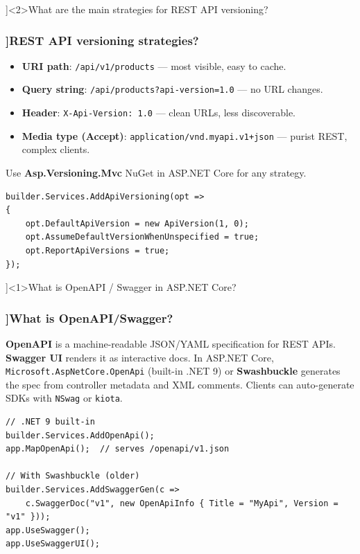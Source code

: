 \QuestionSlide[\CategoryBadge[RestColor!20]{REST \& SignalR}]<2>{What are the main strategies for REST API versioning?}

\begin{frame}[fragile]
  \frametitle{\AnswerTitle[\CategoryBadge[RestColor!20]{REST \& SignalR}]{REST API versioning strategies?}}

  {\footnotesize
  \begin{itemize}
    \item \textbf{URI path}: \texttt{/api/v1/products} — most visible, easy to cache.
    \item \textbf{Query string}: \texttt{/api/products?api-version=1.0} — no URL changes.
    \item \textbf{Header}: \texttt{X-Api-Version: 1.0} — clean URLs, less discoverable.
    \item \textbf{Media type (Accept)}: \texttt{application/vnd.myapi.v1+json} — purist REST, complex clients.
  \end{itemize}
  Use \textbf{Asp.Versioning.Mvc} NuGet in ASP.NET Core for any strategy.
  }

  \begin{verbatim}
builder.Services.AddApiVersioning(opt =>
{
    opt.DefaultApiVersion = new ApiVersion(1, 0);
    opt.AssumeDefaultVersionWhenUnspecified = true;
    opt.ReportApiVersions = true;
});
  \end{verbatim}
\end{frame}

\QuestionSlide[\CategoryBadge[RestColor!20]{REST \& SignalR}]<1>{What is OpenAPI / Swagger in ASP.NET Core?}

\begin{frame}[fragile]
  \frametitle{\AnswerTitle[\CategoryBadge[RestColor!20]{REST \& SignalR}]{What is OpenAPI/Swagger?}}

  {\footnotesize
  \textbf{OpenAPI} is a machine-readable JSON/YAML specification for REST APIs. \textbf{Swagger UI} renders it as interactive docs. In ASP.NET Core, \texttt{Microsoft.AspNetCore.OpenApi} (built-in .NET 9) or \textbf{Swashbuckle} generates the spec from controller metadata and XML comments. Clients can auto-generate SDKs with \texttt{NSwag} or \texttt{kiota}.
  }

  \begin{verbatim}
// .NET 9 built-in
builder.Services.AddOpenApi();
app.MapOpenApi();  // serves /openapi/v1.json

// With Swashbuckle (older)
builder.Services.AddSwaggerGen(c =>
    c.SwaggerDoc("v1", new OpenApiInfo { Title = "MyApi", Version = "v1" }));
app.UseSwagger();
app.UseSwaggerUI();
  \end{verbatim}
\end{frame}


